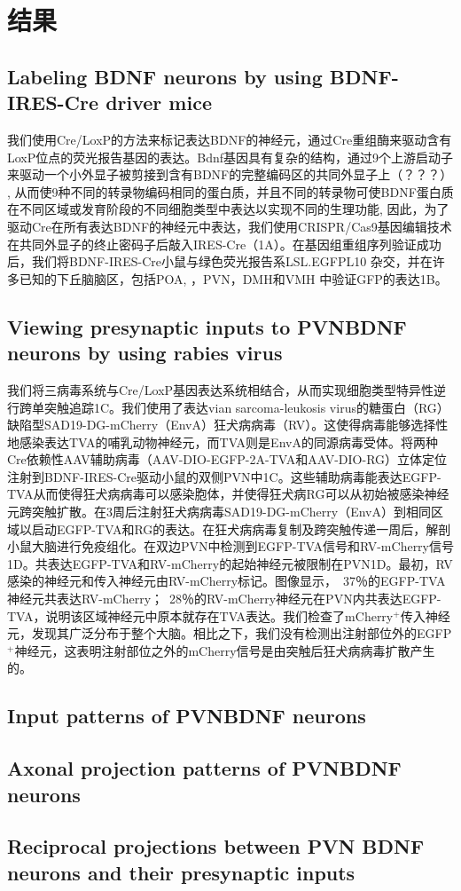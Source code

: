 \chapter{结果}\label{chap:results}

\section{Labeling BDNF neurons by using BDNF-IRES-Cre driver mice}
我们使用Cre/LoxP的方法来标记表达BDNF的神经元，通过Cre重组酶来驱动含有LoxP位点的荧光报告基因的表达。Bdnf基因具有复杂的结构，通过9个上游启动子来驱动一个小外显子被剪接到含有BDNF的完整编码区的共同外显子上（？？？） \cite{timmusk1993multiple}, \cite{altieri2004expression}从而使9种不同的转录物编码相同的蛋白质，并且不同的转录物可使BDNF蛋白质在不同区域或发育阶段的不同细胞类型中表达以实现不同的生理功能\citep{sakata2009critical}, \cite{maynard2016functional}因此，为了驱动Cre在所有表达BDNF的神经元中表达，我们使用CRISPR/Cas9基因编辑技术在共同外显子的终止密码子后敲入IRES-Cre（\figurename{1A}）。在基因组重组序列验证成功后，我们将BDNF-IRES-Cre小鼠与绿色荧光报告系LSL.EGFPL10 \cite{stanley2013profiling}杂交，并在许多已知的下丘脑脑区，包括POA\citep{tan2016warm}, \cite{zhao2017hypothalamic}，PVN\citep{an2015discrete}，DMH和VMH\citep{unger2007selective,wang2010brain} 中验证GFP的表达\figurename{1B}。

\section{Viewing presynaptic inputs to PVNBDNF neurons by using rabies virus}
我们将三病毒系统与Cre/LoxP基因表达系统\citep{wickersham2007monosynaptic}相结合，从而实现细胞类型特异性逆行跨单突触追踪\figurename{1C}。我们使用了表达vian sarcoma-leukosis virus的糖蛋白（RG）缺陷型SAD19-DG-mCherry（EnvA）狂犬病病毒（RV）。这使得病毒能够选择性地感染表达TVA的哺乳动物神经元，而TVA则是EnvA的同源病毒受体。将两种Cre依赖性AAV辅助病毒（AAV-DIO-EGFP-2A-TVA和AAV-DIO-RG）立体定位注射到BDNF-IRES-Cre驱动小鼠的双侧PVN中\figurename{1C}。这些辅助病毒能表达EGFP-TVA从而使得狂犬病病毒可以感染胞体，并使得狂犬病RG可以从初始被感染神经元跨突触扩散。在3周后注射狂犬病病毒SAD19-DG-mCherry（EnvA）到相同区域以启动EGFP-TVA和RG的表达。在狂犬病病毒复制及跨突触传递一周后，解剖小鼠大脑进行免疫组化。在双边PVN中检测到EGFP-TVA信号和RV-mCherry信号\figurename{1D}。共表达EGFP-TVA和RV-mCherry的起始神经元被限制在PVN\figurename{1D}。最初，RV感染的神经元和传入神经元由RV-mCherry标记。图像显示，~37％的EGFP-TVA神经元共表达RV-mCherry；~28％的RV-mCherry神经元在PVN内共表达EGFP-TVA，说明该区域神经元中原本就存在TVA表达。\label{1D}我们检查了mCherry$^{+}$传入神经元，发现其广泛分布于整个大脑。相比之下，我们没有检测出注射部位外的EGFP$^{+}$神经元，这表明注射部位之外的mCherry信号是由突触后狂犬病病毒扩散产生的。

\section{Input patterns of PVNBDNF neurons}


\section{Axonal projection patterns of PVNBDNF neurons}

\section{Reciprocal projections between PVN BDNF neurons and their presynaptic inputs}
